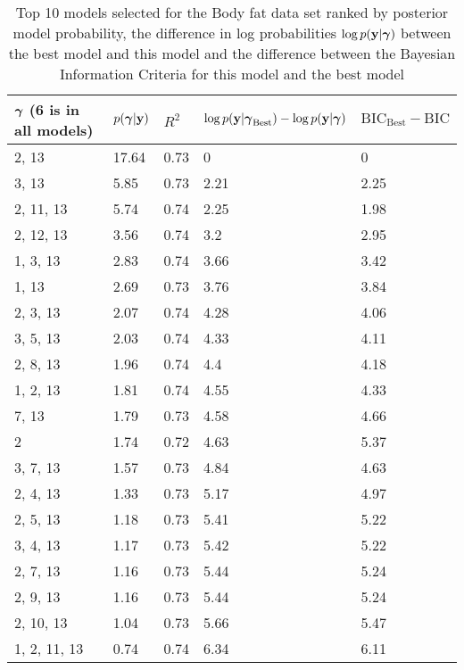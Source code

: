 \documentclass{amsart}
\begin{document}
\begin{table}
\label{tab:numerical_results_bodyfat}
\caption{Top 10 models selected for the Body fat data set ranked by posterior model probability, the difference
					in log probabilities $\log p({\bf y}|{\boldsymbol \gamma})$ between the best model and this model and the difference
					between the Bayesian Information Criteria for this model and the best model}
\begin{tabular}{|l|llll|}
\hline
${\boldsymbol \gamma}$ (6 is in all models) & $p({\boldsymbol \gamma}|{\bf y})$ & $R^2$ & $\log p({\bf y} | {\boldsymbol \gamma}_\text{Best}) - \log p({\bf y} | {\boldsymbol \gamma})$ & $\text{BIC}_\text{Best} - \text{BIC}$ \\
\hline
2, 13&  17.64&  0.73&  0&  0\\
3, 13&  5.85&  0.73&  2.21&  2.25\\
2, 11, 13&  5.74&  0.74&  2.25&  1.98\\
2, 12, 13&  3.56&  0.74&  3.2&  2.95\\
1, 3, 13&  2.83&  0.74&  3.66&  3.42\\
1, 13&  2.69&  0.73&  3.76&  3.84\\
2, 3, 13&  2.07&  0.74&  4.28&  4.06\\
3, 5, 13&  2.03&  0.74&  4.33&  4.11\\
2, 8, 13&  1.96&  0.74&  4.4&  4.18\\
1, 2, 13&  1.81&  0.74&  4.55&  4.33\\
7, 13&  1.79&  0.73&  4.58&  4.66\\
2&  1.74&  0.72&  4.63&  5.37\\
3, 7, 13&  1.57&  0.73&  4.84&  4.63\\
2, 4, 13&  1.33&  0.73&  5.17&  4.97\\
2, 5, 13&  1.18&  0.73&  5.41&  5.22\\
3, 4, 13&  1.17&  0.73&  5.42&  5.22\\
2, 7, 13&  1.16&  0.73&  5.44&  5.24\\
2, 9, 13&  1.16&  0.73&  5.44&  5.24\\
2, 10, 13&  1.04&  0.73&  5.66&  5.47\\
1, 2, 11, 13&  0.74&  0.74&  6.34&  6.11\\
\hline
\end{tabular}
\end{table}
\end{document}
